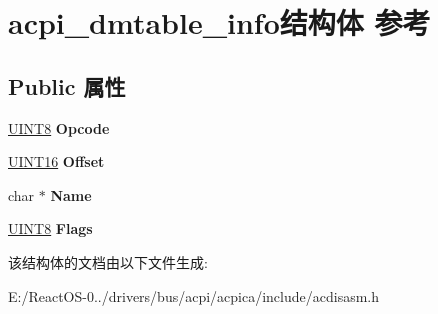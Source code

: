 \hypertarget{structacpi__dmtable__info}{}\section{acpi\+\_\+dmtable\+\_\+info结构体 参考}
\label{structacpi__dmtable__info}
\subsection*{Public 属性}
\begin{DoxyCompactItemize}
\item 
\mbox{\label{structacpi__dmtable__info_a6afddc9843594226594c2db4b12ca525}} 
\hyperlink{_processor_bind_8h_ab27e9918b538ce9d8ca692479b375b6a}{U\+I\+N\+T8} {\bfseries Opcode}
\item 
\mbox{\label{structacpi__dmtable__info_ad6b3b8593cba83da7054e278b4c118a6}} 
\hyperlink{_processor_bind_8h_a09f1a1fb2293e33483cc8d44aefb1eb1}{U\+I\+N\+T16} {\bfseries Offset}
\item 
\mbox{\label{structacpi__dmtable__info_abf720a4849f381177544e785c68d8062}} 
char $\ast$ {\bfseries Name}
\item 
\mbox{\label{structacpi__dmtable__info_af12d79a614d4657e200783bee1d64d68}} 
\hyperlink{_processor_bind_8h_ab27e9918b538ce9d8ca692479b375b6a}{U\+I\+N\+T8} {\bfseries Flags}
\end{DoxyCompactItemize}


该结构体的文档由以下文件生成\+:\begin{DoxyCompactItemize}
\item 
E\+:/\+React\+O\+S-\/0../drivers/bus/acpi/acpica/include/acdisasm.\+h\end{DoxyCompactItemize}
